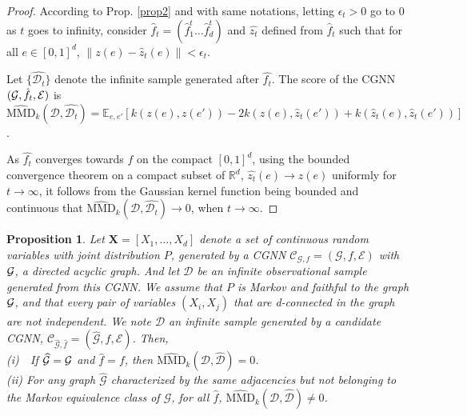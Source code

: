\documentclass[a4paper, 11pt]{article}
\newtheorem{prop}{Proposition}
\begin{document}
\begin{proof}
According to Prop. \ref{prop2} and with same notations, letting $\epsilon_t > 0$ go to 0 as $t$ goes to infinity, consider  ${\hat f}_t=(\hat f^{t}_1 \ldots \hat f^{t}_d)$ and $\hat{z_t}$ defined from ${\hat f}_t$ such that for all $e \in [0,1]^d$, $\|z(e)- \widehat{z}_t(e)\| < \epsilon_t$. 

Let $\{ \hat{\mathcal{D}_t} \}$ denote the infinite sample generated after $\hat{f_t}$.
The score of the CGNN $(\mathcal{G},\hat{f_t},{\cal E})$ is $ \widehat{\text{MMD}}_k(\mathcal{D}, \hat{\mathcal{D}_t}) =  \mathbb{E}_{e,e'}[k(z(e),z(e')) - 2  k(z(e),\widehat{z}_t(e')) + k(\widehat{z}_t(e), \widehat{z}_t(e'))]$.

As $\hat{f_t}$ converges towards $f$ on the compact $[0,1]^d$, using the bounded convergence theorem on a compact subset of $\mathbb{R}^{d}$,  $\widehat{z_t}(e) \rightarrow z(e)$ uniformly for $t \rightarrow \infty$, it follows from the Gaussian kernel function being bounded and continuous that $\widehat{\text{MMD}}_k(\mathcal{D}, \hat{\mathcal{D}_t}) \rightarrow 0$, when $t \rightarrow \infty$.
\end{proof}

\begin{prop}
Let $\textbf{X} = [X_1, \ldots, X_d]$ denote a set of continuous random variables with joint distribution $P$, generated by a CGNN $\mathcal{C}_{\mathcal{G},f} = (\mathcal{G}, f, \mathcal{E})$ with ${\cal G}$, a directed acyclic graph. And let $\mathcal{D}$ be an infinite observational sample generated from this CGNN. We assume that $P$ is Markov and faithful to the graph ${\cal G}$, and that every  pair of variables $(X_i,X_j)$ that are  d-connected in the graph are not independent. We note $\widehat{\mathcal{D}}$ an infinite sample generated by a candidate CGNN, $\mathcal{C}_{\widehat{\mathcal{G}},\hat{f}} = (\widehat{\mathcal{G}}, \hat{f}, \mathcal{E})$. Then, \\
(i)\ \ If $\widehat{\mathcal{G}} = {\cal G}$ and $\hat{f} = f$, then $\widehat{\text{MMD}}_k(\mathcal{D}, \widehat{\mathcal{D}}) = 0$.\\
(ii) For any  graph $\widehat{\mathcal{G}}$ characterized by the same adjacencies but not belonging to the Markov equivalence class of $\mathcal{G}$, for all $\hat{f}$, $\widehat{\text{MMD}}_k(\mathcal{D}, \widehat{\mathcal{D}}) \neq 0$.
\end{prop}
\end{document}
